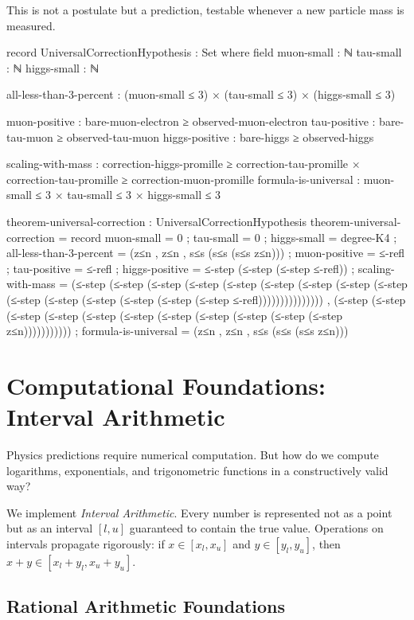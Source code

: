 \documentclass[11pt,a4paper]{book}
\begin{document}
This is not a postulate but a prediction, testable whenever a new particle mass is measured.

\begin{code}
record UniversalCorrectionHypothesis : Set where
  field
    muon-small : ℕ
    tau-small : ℕ
    higgs-small : ℕ
    
    all-less-than-3-percent : (muon-small ≤ 3) × (tau-small ≤ 3) × (higgs-small ≤ 3)
    
    muon-positive : bare-muon-electron ≥ observed-muon-electron
    tau-positive : bare-tau-muon ≥ observed-tau-muon
    higgs-positive : bare-higgs ≥ observed-higgs
    
    scaling-with-mass : correction-higgs-promille ≥ correction-tau-promille ×
                        correction-tau-promille ≥ correction-muon-promille
    formula-is-universal : muon-small ≤ 3 × tau-small ≤ 3 × higgs-small ≤ 3

theorem-universal-correction : UniversalCorrectionHypothesis
theorem-universal-correction = record
  { muon-small = 0
  ; tau-small = 0
  ; higgs-small = degree-K4
  ; all-less-than-3-percent = (z≤n , z≤n , s≤s (s≤s (s≤s z≤n)))
  ; muon-positive = ≤-refl
  ; tau-positive = ≤-refl
  ; higgs-positive = ≤-step (≤-step (≤-step ≤-refl))
  ; scaling-with-mass = (≤-step (≤-step (≤-step (≤-step (≤-step (≤-step (≤-step (≤-step (≤-step (≤-step (≤-step (≤-step (≤-step (≤-step (≤-step ≤-refl))))))))))))))) , 
                         (≤-step (≤-step (≤-step (≤-step (≤-step (≤-step (≤-step (≤-step (≤-step (≤-step (≤-step z≤n)))))))))))
  ; formula-is-universal = (z≤n , z≤n , s≤s (s≤s (s≤s z≤n)))
  }
\end{code}

\chapter{Computational Foundations: Interval Arithmetic}

Physics predictions require numerical computation. But how do we compute logarithms, exponentials, and trigonometric functions in a constructively valid way?

We implement \emph{Interval Arithmetic}. Every number is represented not as a point but as an interval $[l, u]$ guaranteed to contain the true value.
Operations on intervals propagate rigorously: if $x \in [x_l, x_u]$ and $y \in [y_l, y_u]$, then $x + y \in [x_l + y_l, x_u + y_u]$.

\section{Rational Arithmetic Foundations}
\end{document}
